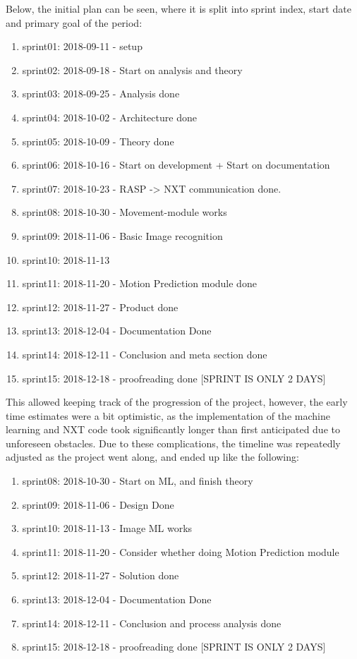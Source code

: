 Below, the initial plan can be seen, where it is split into sprint index, start date and primary goal of the period:
\begin{enumerate}
	\item sprint01: 2018-09-11 - setup
	\item sprint02: 2018-09-18 - Start on analysis and theory
	\item sprint03: 2018-09-25 - Analysis done 
	\item sprint04: 2018-10-02 - Architecture done
	\item sprint05: 2018-10-09 - Theory done
	\item sprint06: 2018-10-16 - Start on development + Start on documentation
	\item sprint07: 2018-10-23 - RASP -> NXT communication done.
	\item sprint08: 2018-10-30 - Movement-module works
	\item sprint09: 2018-11-06 - Basic Image recognition
	\item sprint10: 2018-11-13
	\item sprint11: 2018-11-20 - Motion Prediction module done
	\item sprint12: 2018-11-27 - Product done
	\item sprint13: 2018-12-04 - Documentation Done
	\item sprint14: 2018-12-11 - Conclusion and meta section done
	\item sprint15: 2018-12-18 - proofreading done [SPRINT IS ONLY 2 DAYS]
\end{enumerate}

This allowed keeping track of the progression of the project, however, the early time estimates were a bit optimistic, as the implementation of the machine learning and NXT code took significantly longer than first anticipated due to unforeseen obstacles.
Due to these complications, the timeline was repeatedly adjusted as the project went along, and ended up like the following:
\begin{enumerate}
	\item	sprint08: 2018-10-30 - Start on ML, and finish theory
	\item	sprint09: 2018-11-06 - Design Done
	\item	sprint10: 2018-11-13 - Image ML works
	\item	sprint11: 2018-11-20 - Consider whether doing Motion Prediction module
	\item	sprint12: 2018-11-27 - Solution done
	\item	sprint13: 2018-12-04 - Documentation Done
	\item	sprint14: 2018-12-11 - Conclusion and process analysis done
	\item	sprint15: 2018-12-18 - proofreading done [SPRINT IS ONLY 2 DAYS]
\end{enumerate}

